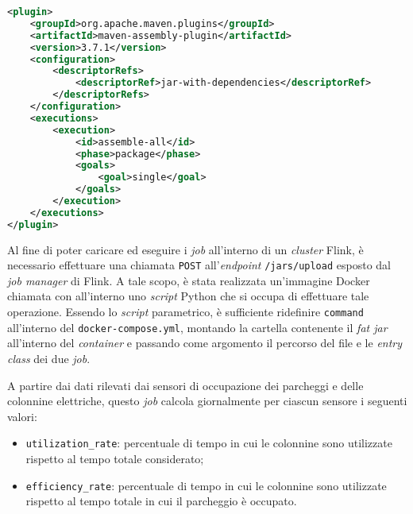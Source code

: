 \begin{lstlisting}[language=XML, caption=Configurazione del \textit{plugin} \texttt{maven-assembly-plugin} per la creazione del \textit{fat jar},captionpos=b]
<plugin>
    <groupId>org.apache.maven.plugins</groupId>
    <artifactId>maven-assembly-plugin</artifactId>
    <version>3.7.1</version>
    <configuration>
        <descriptorRefs>
            <descriptorRef>jar-with-dependencies</descriptorRef>
        </descriptorRefs>
    </configuration>
    <executions>
        <execution>
            <id>assemble-all</id>
            <phase>package</phase>
            <goals>
                <goal>single</goal>
            </goals>
        </execution>
    </executions>
</plugin>
\end{lstlisting}
Al fine di poter caricare ed eseguire i \textit{job} all'interno di un \textit{cluster} Flink, è necessario effettuare una chiamata \texttt{POST} all'\textit{endpoint} \texttt{/jars/upload}
esposto dal \textit{job manager} di Flink. A tale scopo, è stata realizzata un'immagine Docker chiamata \texttt{} con all'interno uno \textit{script}
Python che si occupa di effettuare tale operazione. Essendo lo \textit{script} parametrico, è sufficiente ridefinire \texttt{command} all'interno del \texttt{docker-compose.yml},
montando la cartella contenente il \textit{fat jar} all'interno del \textit{container} e passando come argomento il percorso del file e le \textit{entry class} dei due \textit{job}.

A partire dai dati rilevati dai sensori di occupazione dei parcheggi e delle colonnine elettriche, questo \textit{job} calcola giornalmente per ciascun sensore i seguenti valori:
\begin{itemize}
	\item \texttt{utilization\_rate}: percentuale di tempo in cui le colonnine sono utilizzate rispetto al tempo totale considerato;
	\item \texttt{efficiency\_rate}: percentuale di tempo in cui le colonnine sono utilizzate rispetto al tempo totale in cui il parcheggio è occupato.
\end{itemize}

